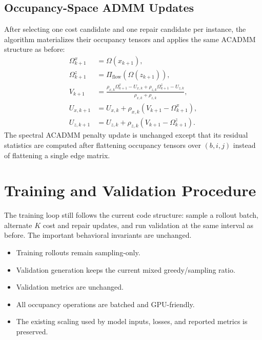 \documentclass{article}
\begin{document}
\subsection{Occupancy-Space ADMM Updates}
After selecting one cost candidate and one repair candidate per instance, the algorithm materializes their occupancy tensors and applies the same ACADMM structure as before:
\begin{align}
\Omega^x_{k+1} &= \Omega(x_{k+1}),\\
\Omega^z_{k+1} &= \Pi_{\mathrm{flow}}(\Omega(z_{k+1})),\\
V_{k+1}
&=
\frac{\rho_{x,k}\Omega^x_{k+1}-U_{x,k}+\rho_{z,k}\Omega^z_{k+1}-U_{z,k}}
{\rho_{x,k}+\rho_{z,k}},\\
U_{x,k+1}
&=
U_{x,k}+\rho_{x,k}(V_{k+1}-\Omega^x_{k+1}),\\
U_{z,k+1}
&=
U_{z,k}+\rho_{z,k}(V_{k+1}-\Omega^z_{k+1}).
\end{align}
The spectral ACADMM penalty update is unchanged except that its residual statistics are computed after flattening occupancy tensors over $(b,i,j)$ instead of flattening a single edge matrix.

\section{Training and Validation Procedure}
The training loop still follows the current code structure: sample a rollout batch, alternate $K$ cost and repair updates, and run validation at the same interval as before. The important behavioral invariants are unchanged.
\begin{itemize}
\item Training rollouts remain sampling-only.
\item Validation generation keeps the current mixed greedy/sampling ratio.
\item Validation metrics are unchanged.
\item All occupancy operations are batched and GPU-friendly.
\item The existing scaling used by model inputs, losses, and reported metrics is preserved.
\end{itemize}
\end{document}
